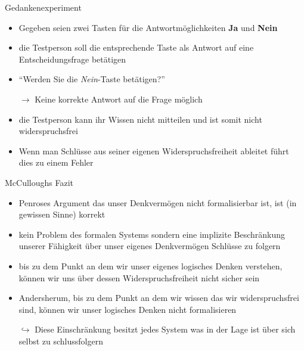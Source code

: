 
\begin{frame}{Gedankenexperiment}
    \begin{itemize}
        \item Gegeben seien zwei Tasten für die Antwortmöglichkeiten \textbf{Ja} und \textbf{Nein}
        \item die Testperson soll die entsprechende Taste als Antwort auf eine Entscheidungsfrage betätigen
        \item \enquote{Werden Sie die \emph{Nein}-Taste betätigen?}
        \item[$\rightarrow$] Keine korrekte Antwort auf die Frage möglich
        \item die Testperson kann ihr Wissen nicht mitteilen und ist somit nicht widerspruchsfrei
        \item Wenn man Schlüsse aus seiner eigenen Widerspruchsfreiheit ableitet führt dies zu einem Fehler
    \end{itemize}
\end{frame}

\begin{frame}{McCulloughs Fazit}
    \begin{itemize}
        \item Penroses Argument das unser Denkvermögen nicht formalisierbar ist, ist (in gewissen Sinne) korrekt
        \item kein Problem des formalen Systems sondern eine implizite Beschränkung unserer Fähigkeit über unser eigenes Denkvermögen Schlüsse zu folgern
        \item bis zu dem Punkt an dem wir unser eigenes logisches Denken verstehen, können wir uns über dessen Widerspruchsfreiheit nicht sicher sein
        \item Andersherum, bis zu dem Punkt an dem wir wissen das wir widerspruchsfrei sind, können wir unser logisches Denken nicht formalisieren
        \item[$\hookrightarrow$] Diese Einschränkung besitzt jedes System was in der Lage ist über sich selbst zu schlussfolgern
    \end{itemize}
\end{frame}

